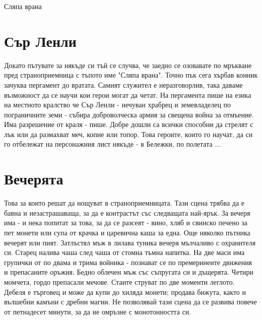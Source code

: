 \documentclass{article}
\newcommand{\directspeech}[1]{#1}  %
\begin{document}
{\huge Сляпа врана}
\section{Сър Ленли}
\directspeech{Докато пътувате за някъде си тъй се случва, че заедно се озовавате по мръкване пред страноприемница с тъпото име "Сляпа врана". Точно пък сега хърбав конник зачуква пергамент до вратата.}
Самият служител е неразговорлив, така даваме възможност да се научи кои герои могат да четат.
На пергамента пише на езика на местното кралство че
\directspeech{Сър Ленли - нечуван храбрец и земевладелец по пограничните земи - събира доброволческа армия за свещена война за отмъение.
Има разрешение от краля - пише.
Добре дошли са всички способни да стрелят с лък или да размахват меч, копие или топор.}
Това героите, които го научат, да си го отбележат на персонажния лист някъде - в Бележки, по полетата ...

\section{Вечерята}
Това за които решат да нощуват в страноприемницата.
Тази сцена трябва да е бавна и незастрашаваща, за да е контрастът със следващата най-ярък.
За вечеря има - и нека попитат за това, за да се разсеят -
\directspeech{вино, хляб и свинско печено за пет монети или супа от крачка и царевична каша за една}.
Още няколко пътника вечерят или пият.
Затлъстял мъж в лилава туника вечеря мълчаливо с охранителя си.
Старец налива чаша след чаша от стомна тъмна напитка.
На две маси има групички от по двама и трима войника - познават се по премеринеите движения и препасаните оръжия.
Бедно облечен мъж със съпругата си и дъщерята.
Четири момчета, гордо препасали мечове.
Стаите струват по две моменти леглото.
Дебеля е търговец и може да купи до хиляда монети; продава бижута, както и вълшебни камъни с дребни магии.
Не позволявай тази сцена да се развива повече от петнадесет минути, за да не омръзне с монотонността си.
\end{document}
